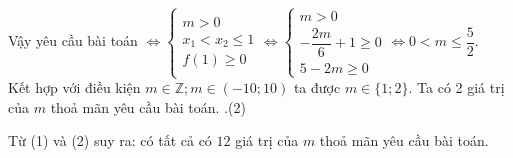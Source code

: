 \begin{ex}
{\begin{enumerate}[TH 1.]
\begin{center}
				\end{center}
				Vậy yêu cầu bài toán $\Leftrightarrow\left\{\begin{array}{l}m>0 \\ x_1<x_2 \leq 1 \\ f(1) \geq 0\end{array} \Leftrightarrow\left\{\begin{array}{l}m>0 \\ -\dfrac{2 m}{6}+1 \geq 0 \\ 5-2 m \geq 0\end{array} \Leftrightarrow 0<m \leq \dfrac{5}{2}\right.\right.$.\\
				Kết hợp với điều kiện $m \in \mathbb{Z} ; m \in(-10 ; 10)$ ta được $m \in\{1 ; 2\}$. Ta có 2 giá trị của $m$ thoả mãn yêu cầu bài toán. .\hfill{(2)}
			\end{enumerate}
			Từ (1) và (2) suy ra: có tất cả có $12$ giá trị của $m$ thoả mãn yêu cầu bài toán.	
		}	
	\end{ex}
	
